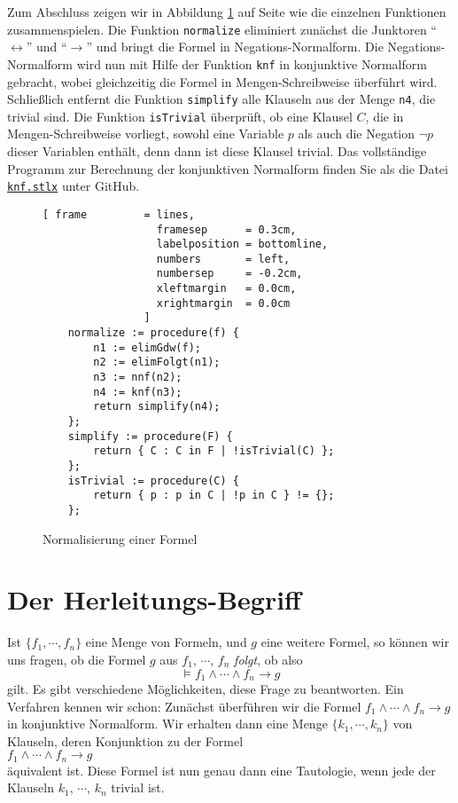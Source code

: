 Zum Abschluss zeigen wir in Abbildung \ref{fig:normalize} auf Seite \pageref{fig:normalize}
wie die einzelnen Funktionen zusammenspielen.  Die Funktion \texttt{normalize} eliminiert
zun\"{a}chst die Junktoren ``$\leftrightarrow$'' und ``$\rightarrow$'' und bringt die Formel
in Negations-Normalform.  Die Negations-Normalform wird nun mit Hilfe der Funktion
\texttt{knf} in konjunktive Normalform gebracht, wobei gleichzeitig die Formel in
Mengen-Schreibweise \"{u}berf\"{u}hrt wird.  Schlie{\ss}lich entfernt die Funktion \texttt{simplify}
alle Klauseln aus der Menge \texttt{n4}, die trivial sind.  Die Funktion \texttt{isTrivial}
\"uberpr\"uft, ob eine Klausel $C$, die in Mengen-Schreibweise vorliegt, sowohl eine Variable $p$
als auch die Negation $\neg p$ dieser Variablen enth\"alt, denn dann ist diese Klausel trivial.  
Das vollst\"{a}ndige Programm zur Berechnung der konjunktiven Normalform finden Sie als die Datei
\href{https://github.com/karlstroetmann/Logik/blob/master/SetlX/knf.stlx}{\texttt{knf.stlx}} 
unter GitHub.

\begin{figure}[!ht]
  \centering
\begin{Verbatim}[ frame         = lines, 
                  framesep      = 0.3cm, 
                  labelposition = bottomline,
                  numbers       = left,
                  numbersep     = -0.2cm,
                  xleftmargin   = 0.0cm,
                  xrightmargin  = 0.0cm
                ]
    normalize := procedure(f) {
        n1 := elimGdw(f);
        n2 := elimFolgt(n1);
        n3 := nnf(n2);
        n4 := knf(n3);
        return simplify(n4);
    };
    simplify := procedure(F) {
        return { C : C in F | !isTrivial(C) };
    };
    isTrivial := procedure(C) {
        return { p : p in C | !p in C } != {};
    };
\end{Verbatim} 
\vspace*{-0.3cm}
  \caption{Normalisierung einer Formel}
  \label{fig:normalize}
\end{figure}


\section{Der Herleitungs-Begriff}
Ist $\{f_1,\cdots,f_n\}$ eine Menge von Formeln, und $g$ eine weitere Formel, so
k\"{o}nnen wir uns fragen, ob  die  Formel $g$ aus $f_1$, $\cdots$, $f_n$ \emph{\color{blue}folgt}, ob
also 
\[ \models f_1 \wedge \cdots \wedge f_n \rightarrow g \]
gilt.
Es gibt verschiedene M\"{o}glichkeiten, diese Frage zu beantworten.  Ein Verfahren kennen wir
schon: Zun\"{a}chst \"{u}berf\"{u}hren wir die Formel  $f_1 \wedge \cdots \wedge f_n \rightarrow g$ in
konjunktive Normalform.  Wir erhalten dann eine Menge
$\{k_1,\cdots,k_n\}$ von Klauseln, deren Konjunktion zu der  Formel
\\[0.2cm]
\hspace*{1.3cm} $f_1 \wedge \cdots \wedge f_n \rightarrow g$
\\[0.2cm] 
\"{a}quivalent ist.  Diese Formel ist nun genau dann eine Tautologie, wenn
jede der Klauseln $k_1$, $\cdots$, $k_n$ trivial ist.  

